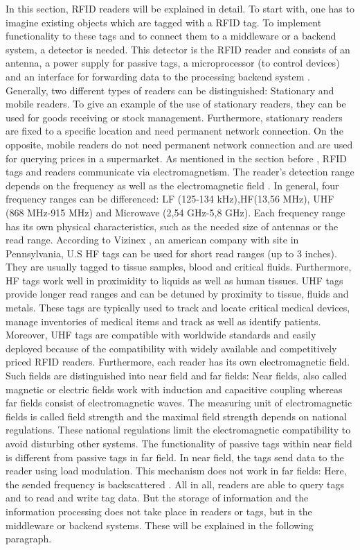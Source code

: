 In this section, RFID readers will be explained in detail. To start with, one has to imagine existing objects which are tagged with a RFID tag. To implement functionality to these tags and to connect them to a middleware or a backend system, a detector is needed. This detector is the RFID reader and consists of an antenna, a power supply for passive tags, a microprocessor (to control devices) and an interface for forwarding data to the processing backend system \cite{henrici}. 
Generally, two different types of readers can be distinguished: Stationary and mobile readers. To give an example of the use of stationary readers, they can be used for goods receiving or stock management. Furthermore, stationary readers are fixed to a specific location and need permanent network connection. On the opposite, mobile readers do not need permanent network connection and are used for querying prices in a supermarket.
As mentioned in the section before \pageref{tags}, RFID tags and readers communicate via electromagnetism. The reader's detection range depends on the frequency as well as the electromagnetic field \cite{henrici}. In general, four frequency ranges can be differenced: \ac{LF} (125-134 kHz),\ac{HF}(13,56 MHz), \ac{UHF} (868 MHz-915 MHz) and Microwave (2,54 GHz-5,8 GHz). Each frequency range has its own physical characteristics, such as the needed size of antennas or the read range.
According to Vizinex \cite{vizinex}, an american company with site in Pennsylvania, U.S HF tags can be used for short read ranges (up to 3 inches). They are usually tagged to tissue samples, blood and critical fluids. Furthermore, HF tags work well in proximidity to liquids as well as human tissues. UHF tags provide longer read ranges and can be detuned by proximity to tissue, fluids and metals. These tags are typically used to track and locate critical medical devices, manage inventories of medical items and track as well as identify patients. Moreover, UHF tags are compatible with worldwide standards and easily deployed because of the compatibility with widely available and competitively priced RFID readers.
Furthermore, each reader has its own electromagnetic field. Such fields are distinguished into near field and far fields: Near fields, also called magnetic or electric fields work with induction and capacitive coupling whereas far fields consist of electromagnetic waves. The measuring unit of electromagnetic fields is called field strength and the maximal field strength depends on national regulations. These national regulations limit the electromagnetic compatibility to avoid disturbing other systems. The functionality of passive tags within near field is different from passive tags in far field. In near field, the tags send data to the reader using load modulation. This mechanism does not work in far fields: Here, the sended frequency is backscattered \cite{henrici}.
All in all, readers are able to query tags and to read and write tag data. But the storage of information and the information processing does not take place in readers or tags, but in the middleware or backend systems. These will be explained in the following paragraph.

